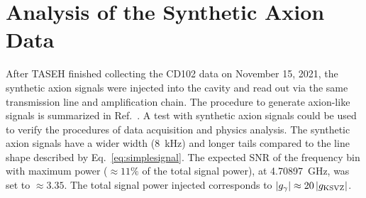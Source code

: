 \section{Analysis of the Synthetic Axion Data}\label{sec:faxion}
After TASEH finished collecting the CD102 data on November 15, 2021, 
the synthetic axion signals were injected into the cavity and read out via the 
same transmission line and amplification chain. The procedure 
to generate axion-like signals is summarized in 
Ref.~\cite{TASEHInstrumentation}. 
A test with synthetic axion signals could be used to verify the procedures of 
data acquisition and physics analysis. The synthetic axion signals 
have a wider width (8~kHz) and longer tails compared to the line shape 
described by Eq.~\eqref{eq:simplesignal}. 
The expected SNR of the frequency bin with maximum power ($\approx 11\%$ of 
the total signal power), 
 at 4.70897~GHz, was set to $\approx 3.35$. 
The total signal power injected 
corresponds to $\left|g_{\gamma}\right|\approx 20 \left|g_\text{KSVZ}\right|$. 


